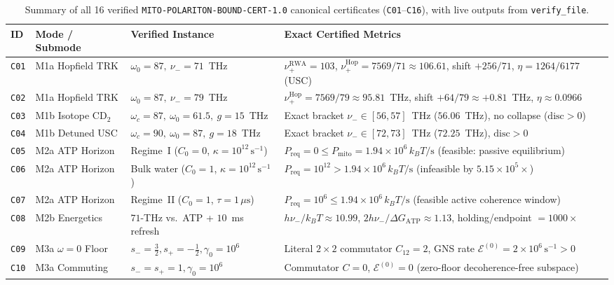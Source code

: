 \documentclass[10pt,twocolumn]{article}
\begin{document}
\begin{table}[t]
\centering
\scriptsize
\setlength{\tabcolsep}{3.6pt}
\caption{Summary of all 16 verified \texttt{MITO-POLARITON-BOUND-CERT-1.0} canonical certificates (\texttt{C01}--\texttt{C16}), with live outputs from \texttt{verify\_file}.}
\label{tab:certs}
\begin{tabular}{@{}llll@{}}
\toprule
ID & Mode / Submode & Verified Instance & Exact Certified Metrics \\
\midrule
\texttt{C01} & M1a Hopfield TRK & $\omega_0=87,\ \nu_-=71$~THz & $\nu_+^{\mathrm{RWA}}=103$, $\nu_+^{\mathrm{Hop}}=7569/71\approx 106.61$, shift $+256/71$, $\eta=1264/6177$ (USC) \\
\texttt{C02} & M1a Hopfield TRK & $\omega_0=87,\ \nu_-=79$~THz & $\nu_+^{\mathrm{Hop}}=7569/79\approx 95.81$~THz, shift $+64/79\approx +0.81$~THz, $\eta\approx 0.0966$ \\
\texttt{C03} & M1b Isotope $\text{CD}_2$ & $\omega_c=87,\ \omega_0=61.5,\ g=15$~THz & Exact bracket $\nu_-\in[56, 57]$~THz ($56.06$~THz), no collapse ($\mathrm{disc}>0$) \\
\texttt{C04} & M1b Detuned USC & $\omega_c=90,\ \omega_0=87,\ g=18$~THz & Exact bracket $\nu_-\in[72, 73]$~THz ($72.25$~THz), $\mathrm{disc}>0$ \\
\texttt{C05} & M2a ATP Horizon & Regime~I ($C_0=0$, $\kappa=10^{12}\,\mathrm{s}^{-1}$) & $P_{\mathrm{req}}=0 \le P_{\mathrm{mito}}=1.94\times 10^6\,k_BT/\mathrm{s}$ (feasible: passive equilibrium) \\
\texttt{C06} & M2a ATP Horizon & Bulk water ($C_0=1$, $\kappa=10^{12}\,\mathrm{s}^{-1}$) & $P_{\mathrm{req}}=10^{12} > 1.94\times 10^6\,k_BT/\mathrm{s}$ (infeasible by $5.15\times 10^5\times$) \\
\texttt{C07} & M2a ATP Horizon & Regime~II ($C_0=1$, $\tau=1\,\mu\mathrm{s}$) & $P_{\mathrm{req}}=10^6 \le 1.94\times 10^6\,k_BT/\mathrm{s}$ (feasible active coherence window) \\
\texttt{C08} & M2b Energetics & $71$-THz vs.~ATP + $10$~ms refresh & $h\nu_-/k_BT\approx 10.99$, $2h\nu_-/\Delta G_{\mathrm{ATP}}\approx 1.13$, holding/endpoint $= 1000\times$ \\
\texttt{C09} & M3a $\omega=0$ Floor & $s_-=\tfrac{3}{2}, s_+=-\tfrac{1}{2}, \gamma_0=10^6$ & Literal $2\times 2$ commutator $C_{12}=2$, GNS rate $\mathcal{E}^{(0)}=2\times 10^6\,\mathrm{s}^{-1} > 0$ \\
\texttt{C10} & M3a Commuting & $s_-=s_+=1, \gamma_0=10^6$ & Commutator $C=0$, $\mathcal{E}^{(0)}=0$ (zero-floor decoherence-free subspace) \\

\end{tabular}
\end{table}
\end{document}
